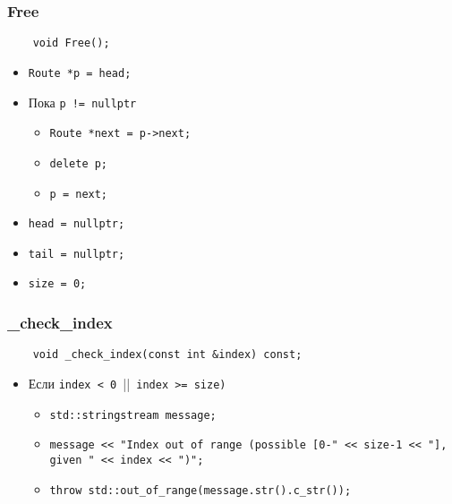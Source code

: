 \subsubsection{Free}

\begin{lstlisting}
    void Free();
\end{lstlisting}

\begin{itemize}
    \item \verb|Route *p = head;|
    \item Пока \verb|p != nullptr|
        \begin{itemize}
            \item \verb|Route *next = p->next;|
            \item \verb|delete p;|
            \item \verb|p = next;|
        \end{itemize}
    \item \verb|head = nullptr;|
    \item \verb|tail = nullptr;|
    \item \verb|size = 0;|
\end{itemize}

\subsubsection{\_check\_index}

\begin{lstlisting}
    void _check_index(const int &index) const;
\end{lstlisting}

\begin{itemize}
    \item Если \verb|index < 0 |||\verb| index >= size)|
        \begin{itemize}
            \item \verb|std::stringstream message;|
            \item \verb|message << "Index out of range (possible [0-" << size-1 << "], given " << index << ")";|
            \item \verb|throw std::out_of_range(message.str().c_str());|
        \end{itemize}
\end{itemize}